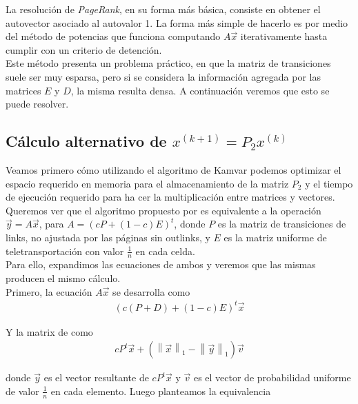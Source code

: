 La resolución de \textit{PageRank}, en su forma más básica, consiste en obtener el autovector
asociado al autovalor 1. La forma más simple de hacerlo es por medio del método de potencias
que funciona computando $A\vec{x}$ iterativamente hasta cumplir con un criterio de detención.\\

Este método presenta un problema práctico, en que la matriz de transiciones suele ser muy
esparsa, pero si se considera la información agregada por las matrices $E$ y $D$, la misma
resulta densa. A continuación veremos que esto se puede resolver.

\subsection{Cálculo alternativo de $x^{(k + 1)} = P_2x^{(k)}$}

Veamos primero cómo utilizando el algoritmo de Kamvar podemos optimizar el espacio requerido
en memoria para el almacenamiento de la matriz $P_2$ y el tiempo de ejecución requerido para ha
cer la multiplicación entre matrices y vectores.\\

\newcommand{\vectornorm}[1]{\left\|#1\right\|}
Queremos ver que el algoritmo propuesto por \cite[Algoritmo 1]{Kamvar2003} es equivalente
a la operación $\vec{y} = A\vec{x}$, para $A=(cP + (1-c)E)^{t}$, donde $P$ es la matriz
de transiciones de links, no ajustada por las páginas sin outlinks,
y $E$ es la matriz uniforme de teletransportación con valor $\frac{1}{n}$ en cada celda.\\

Para ello, expandimos las ecuaciones de ambos y veremos que las mismas producen el mismo cálculo.\\

Primero, la ecuación $A\vec{x}$ se desarrolla como\\
\begin{align*}
(c(P + D) + (1 - c)E)^{t} \vec{x}
\end{align*}

Y la matrix de \cite[Algoritmo 1]{Kamvar 2003} como
\begin{align*}
cP^{t}\vec{x} + (\vectornorm{\vec{x}}_1 - \vectornorm{\vec{y}}_1)\vec{v}
\end{align*}

donde $\vec{y}$ es el vector resultante de $cP^{t}\vec{x}$ y $\vec{v}$ es el vector de probabilidad
uniforme de valor $\frac{1}{n}$ en cada elemento. Luego planteamos la equivalencia

